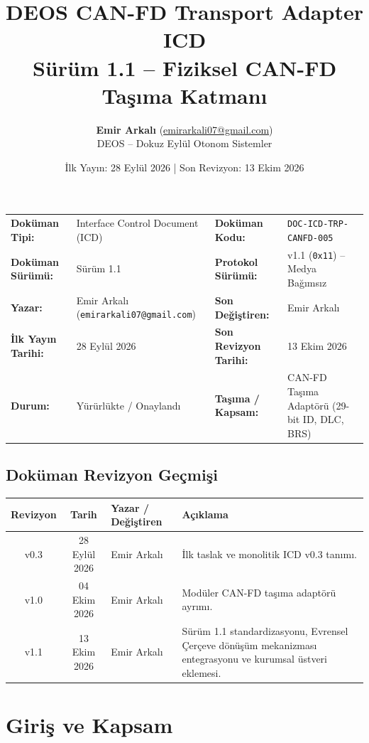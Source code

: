 \documentclass[a4paper,10pt]{article}
\title{\textbf{DEOS CAN-FD Transport Adapter ICD}\\
\large Sürüm 1.1 -- Fiziksel CAN-FD Taşıma Katmanı}
\author{\textbf{Emir Arkalı} (\href{mailto:emirarkali07@gmail.com}{emirarkali07@gmail.com})\\DEOS -- Dokuz Eylül Otonom Sistemler}
\date{İlk Yayın: 28 Eylül 2026 \quad | \quad Son Revizyon: 13 Ekim 2026}
\newcommand{\hex}[1]{\texttt{0x#1}}
\newcommand{\code}[1]{\texttt{#1}}
\begin{document}
\maketitle

\begin{center}
\small
\begin{tabularx}{\textwidth}{ll lX}
\toprule
\textbf{Doküman Tipi:} & Interface Control Document (ICD) & \textbf{Doküman Kodu:} & \code{DOC-ICD-TRP-CANFD-005} \\
\textbf{Doküman Sürümü:} & Sürüm 1.1 & \textbf{Protokol Sürümü:} & v1.1 (\hex{11}) -- Medya Bağımsız \\
\textbf{Yazar:} & Emir Arkalı (\texttt{emirarkali07@gmail.com}) & \textbf{Son Değiştiren:} & Emir Arkalı \\
\textbf{İlk Yayın Tarihi:} & 28 Eylül 2026 & \textbf{Son Revizyon Tarihi:} & 13 Ekim 2026 \\
\textbf{Durum:} & Yürürlükte / Onaylandı & \textbf{Taşıma / Kapsam:} & CAN-FD Taşıma Adaptörü (29-bit ID, DLC, BRS) \\
\bottomrule
\end{tabularx}
\end{center}

\subsection*{Doküman Revizyon Geçmişi}
\begin{center}
\small
\begin{tabularx}{\textwidth}{c c l X}
\toprule
\textbf{Revizyon} & \textbf{Tarih} & \textbf{Yazar / Değiştiren} & \textbf{Açıklama} \\
\midrule
v0.3 & 28 Eylül 2026 & Emir Arkalı & İlk taslak ve monolitik ICD v0.3 tanımı. \\
v1.0 & 04 Ekim 2026 & Emir Arkalı & Modüler CAN-FD taşıma adaptörü ayrımı. \\
v1.1 & 13 Ekim 2026 & Emir Arkalı & Sürüm 1.1 standardizasyonu, Evrensel Çerçeve dönüşüm mekanizması entegrasyonu ve kurumsal üstveri eklemesi. \\
\bottomrule
\end{tabularx}
\end{center}
\vspace{0.8em}

\section{Giriş ve Kapsam}
\end{document}
